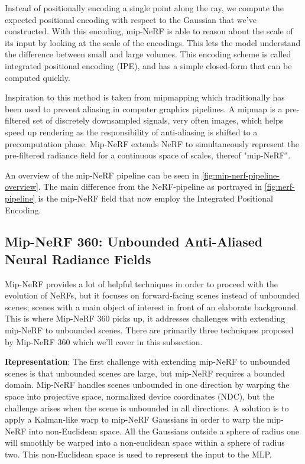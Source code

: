 

Instead of positionally encoding a single point along the ray, we compute the expected positional encoding with respect to the Gaussian that we've constructed. With this encoding, mip-NeRF is able to reason about the scale of its input by looking at the scale of the encodings. This lets the model understand the difference between small and large volumes. This encoding scheme is called integrated positional encoding (IPE), and has a simple closed-form that can be computed quickly.

Inspiration to this method is taken from mipmapping which traditionally has been used to prevent aliasing in computer graphics pipelines. A mipmap is a pre-filtered set of discretely downsampled signals, very often images, which helps speed up rendering as the responsibility of anti-aliasing is shifted to a precomputation phase. Mip-NeRF extends NeRF to simultaneously represent the pre-filtered radiance field for a continuous space of scales, thereof "mip-NeRF".

An overview of the mip-NeRF pipeline can be seen in \autoref{fig:mip-nerf-pipeline-overview}. The main difference from the NeRF-pipeline as portrayed in \autoref{fig:nerf-pipeline} is the mip-NeRF field that now employ the Integrated Positional Encoding.





\subsection{Mip-NeRF 360: Unbounded Anti-Aliased Neural Radiance Fields} \label{sec:mipnerf360}
Mip-NeRF provides a lot of helpful techniques in order to proceed with the evolution of NeRFs, but it focuses on forward-facing scenes instead of unbounded scenes; scenes with a main object of interest in front of an elaborate background. This is where Mip-NeRF 360 \cite{barron_mip-nerf_2022} picks up, it addresses challenges with extending mip-NeRF to unbounded scenes. There are primarily three techniques proposed by Mip-NeRF 360 which we'll cover in this subsection.

\textbf{Representation}:
The first challenge with extending mip-NeRF to unbounded scenes is that unbounded scenes are large, but mip-NeRF requires a bounded domain. Mip-NeRF handles scenes unbounded in one direction by warping the space into projective space, normalized device coordinates (NDC), but the challenge arises when the scene is unbounded in all directions. A solution is to apply a Kalman-like warp to mip-NeRF Gaussians in order to warp the mip-NeRF into non-Euclidean space. All the Gaussians outside a sphere of radius one will smoothly be warped into a non-euclidean space within a sphere of radius two. This non-Euclidean space is used to represent the input to the MLP. 


